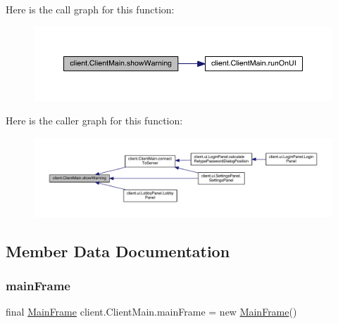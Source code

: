 Here is the call graph for this function\+:
\nopagebreak
\begin{figure}[H]
\begin{center}
\leavevmode
\includegraphics[width=350pt]{classclient_1_1_client_main_a0964644423f3d533ca394456ee6f6c95_cgraph}
\end{center}
\end{figure}
Here is the caller graph for this function\+:
\nopagebreak
\begin{figure}[H]
\begin{center}
\leavevmode
\includegraphics[width=350pt]{classclient_1_1_client_main_a0964644423f3d533ca394456ee6f6c95_icgraph}
\end{center}
\end{figure}


\subsection{Member Data Documentation}
\hypertarget{classclient_1_1_client_main_ab0ba57ef294e065b9140994413a5d705}{}\label{classclient_1_1_client_main_ab0ba57ef294e065b9140994413a5d705} 
\subsubsection{\texorpdfstring{main\+Frame}{mainFrame}}
{\footnotesize\ttfamily final \hyperlink{classclient_1_1ui_1_1_main_frame}{Main\+Frame} client.\+Client\+Main.\+main\+Frame = new \hyperlink{classclient_1_1ui_1_1_main_frame}{Main\+Frame}()\hspace{0.3cm}{\ttfamily [static]}}



